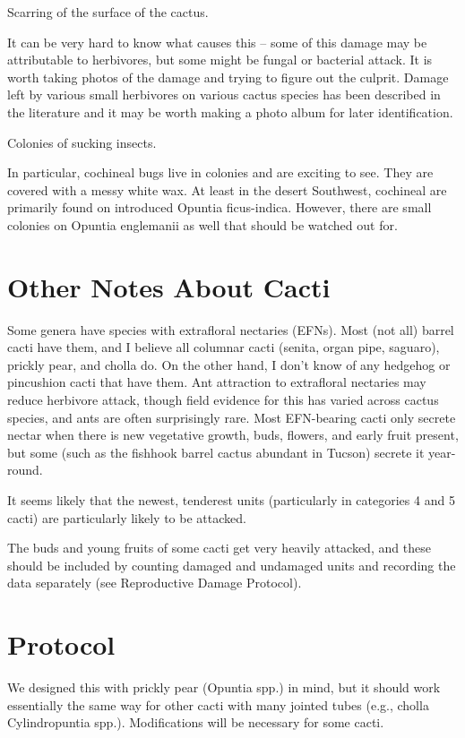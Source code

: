 \documentclass[
  letterpaper,
  DIV=11,
  numbers=noendperiod]{scrreprt}
\begin{document}
Scarring of the surface of the cactus.

It can be very hard to know what causes this -- some of this damage may
be attributable to herbivores, but some might be fungal or bacterial
attack. It is worth taking photos of the damage and trying to figure out
the culprit. Damage left by various small herbivores on various cactus
species has been described in the literature and it may be worth making
a photo album for later identification.

Colonies of sucking insects.

In particular, cochineal bugs live in colonies and are exciting to see.
They are covered with a messy white wax. At least in the desert
Southwest, cochineal are primarily found on introduced Opuntia
ficus-indica. However, there are small colonies on Opuntia englemanii as
well that should be watched out for.

\section{Other Notes About Cacti}\label{other-notes-about-cacti}

Some genera have species with extrafloral nectaries (EFNs). Most (not
all) barrel cacti have them, and I believe all columnar cacti (senita,
organ pipe, saguaro), prickly pear, and cholla do. On the other hand, I
don't know of any hedgehog or pincushion cacti that have them. Ant
attraction to extrafloral nectaries may reduce herbivore attack, though
field evidence for this has varied across cactus species, and ants are
often surprisingly rare. Most EFN-bearing cacti only secrete nectar when
there is new vegetative growth, buds, flowers, and early fruit present,
but some (such as the fishhook barrel cactus abundant in Tucson) secrete
it year-round.

It seems likely that the newest, tenderest units (particularly in
categories 4 and 5 cacti) are particularly likely to be attacked.

The buds and young fruits of some cacti get very heavily attacked, and
these should be included by counting damaged and undamaged units and
recording the data separately (see Reproductive Damage Protocol).

\section{Protocol}\label{protocol-1}

We designed this with prickly pear (Opuntia spp.) in mind, but it should
work essentially the same way for other cacti with many jointed tubes
(e.g., cholla Cylindropuntia spp.). Modifications will be necessary for
some cacti.
\end{document}
